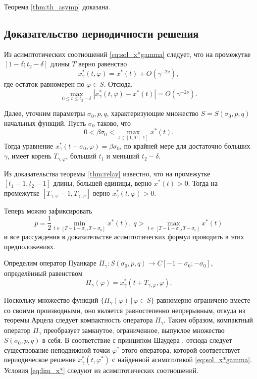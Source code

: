 Теорема \ref{thm:th_asymp} доказана.

\subsection{Доказательство периодичности решения}

Из асимптотических соотношений \eqref{eq:sol_x*gamma} следует, что на промежутке $[1 - \delta; t_2 - \delta]$ длины $T$ верно равенство
\[
x_\gamma^*(t, \varphi) = x^*(t) + O(\gamma^{-2\nu}),
\]
где остаток равномерен по $\varphi \in S$.
Отсюда,
\[
\max\limits_{0 \leqslant t \leqslant t_2 - \delta}|x_\gamma^*(t, \varphi) - x^*(t)| = O(\gamma^{-2\nu}).
\]

Далее, уточним параметры $\sigma_0, p, q$, характеризующие множество $S = S(\sigma_0, p, q)$ начальных функций. Пусть $\sigma_0$ таково, что
%
\[
0 < \beta \sigma_0 < \max\limits_{t \in [1, T + 1]} x^*(t).
\]
%
Тогда уравнение $x^*_\gamma(t - \sigma_0, \varphi) = \beta \sigma_0$, по крайней мере для достаточно больших $\gamma$, имеет корень $T_{\gamma, \varphi}$, больший $t_1$ и меньший $t_2 - \delta$.

Из доказательства теоремы \ref{thm:relay} известно, что на промежутке $[t_1 - 1, t_2 - 1]$ длины, большей единицы, верно $x^*(t) > 0$. Тогда на промежутке $[T_{\gamma, \varphi} - 1, T_{\gamma, \varphi}]$ верно $x^*_{\gamma}(t, \varphi) > 0$.

Теперь можно зафиксировать
\[
p = \frac{1}{2}\min\limits_{t \in [T - 1 - \sigma_0, T - \sigma_0]} x^*(t), \ q > \max\limits_{t \in [T - 1 - \sigma_0, T - \sigma_0]} x^*(t)
\]
и все рассуждения в доказательстве асимптотических формул проводить в этих предположениях.

Определим оператор Пуанкаре $\Pi_{\gamma}: S(\sigma_0, p, q) \to C[-1-\sigma_0; -\sigma_0]$, определённый равенством
\begin{equation}
	\Pi_{\gamma}(\varphi) = x^*_{\gamma}(t + T_{\gamma, \varphi}, \varphi).
\end{equation}

Поскольку множество функций $\{\Pi_{\gamma}(\varphi)\, | \, \varphi \in S\}$ равномерно ограничено вместе со своими производными, оно является равностепенно непрерывным, откуда из теоремы Арцела следует компактность оператора $\Pi_{\gamma}$. Таким образом, компактный оператор $\Pi_{\gamma}$ преобразует замкнутое, ограниченное, выпуклое множество $S(\sigma_0, p, q)$ в себя. В соответствие с принципом Шаудера \cite{Krasnov1975}, отсюда следует существование неподвижной точки $\varphi^*$ этого оператора, которой соответствует периодическое решение $x^*_\gamma(t, \varphi^*)$ с найденной асимптотикой \eqref{eq:sol_x*gamma}. Условия \eqref{eq:lim_x*} следуют из асимптотических соотношений.

